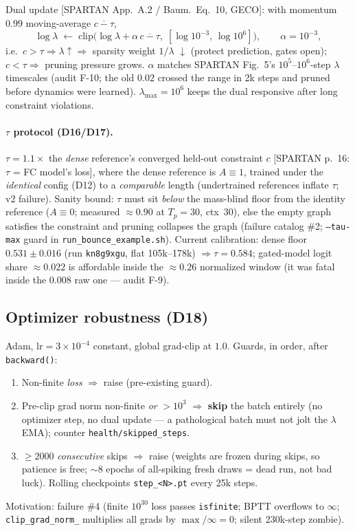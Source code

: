 \documentclass[11pt]{article}
\newcommand{\code}[1]{\texttt{\small #1}}
\newcommand{\paper}[1]{\textcolor{blue!60!black}{[#1]}}
\begin{document}
Dual update \paper{SPARTAN App.~A.2 / Baum.\ Eq.~10, GECO}: with momentum $0.99$
moving-average $\overline{c-\tau}$,
\[
  \log\lambda \;\leftarrow\; \mathrm{clip}\big(\log\lambda + \alpha\,\overline{c-\tau},\;
  [\log 10^{-3},\, \log 10^{6}]\big),\qquad \alpha = 10^{-3},
\]
i.e.\ $c > \tau \Rightarrow \lambda\uparrow \Rightarrow$ sparsity weight $1/\lambda$
$\downarrow$ (protect prediction, gates open); $c < \tau \Rightarrow$ pruning pressure
grows. $\alpha$ matches SPARTAN Fig.~5's $10^5$--$10^6$-step $\lambda$ timescales (audit
F-10; the old $0.02$ crossed the range in 2k steps and pruned before dynamics were
learned). $\lambda_{\max} = 10^6$ keeps the dual responsive after long constraint
violations.

\paragraph{$\tau$ protocol (D16/D17).} $\tau = 1.1\times$ the \emph{dense} reference's
converged held-out constraint $c$ \paper{SPARTAN p.~16: $\tau$ = FC model's loss}, where
the dense reference is $A\equiv1$, trained under the \emph{identical} config (D12) to a
\emph{comparable} length (undertrained references inflate $\tau$; v2 failure). Sanity
bound: $\tau$ must sit \emph{below} the mass-blind floor from the identity reference
($A\equiv0$; measured $\approx0.90$ at $T_p{=}30$, ctx~30), else the empty graph satisfies
the constraint and pruning collapses the graph (failure catalog \#2; \code{--tau-max}
guard in \code{run\_bounce\_example.sh}). Current calibration: dense floor
$0.531\pm0.016$ (run \code{kn8g9xgu}, flat 105k--178k) $\Rightarrow \tau = 0.584$;
gated-model logit share $\approx0.022$ is affordable inside the $\approx0.26$ normalized
window (it was fatal inside the $0.008$ raw one --- audit F-9).

\subsection{Optimizer robustness (D18)}
Adam, $\mathrm{lr}=3\times10^{-4}$ constant, global grad-clip at $1.0$. Guards, in order,
after \code{backward()}:
\begin{enumerate}[nosep]
  \item Non-finite \emph{loss} $\Rightarrow$ raise (pre-existing guard).
  \item Pre-clip grad norm non-finite \emph{or} $> 10^3$ $\Rightarrow$ \textbf{skip} the
        batch entirely (no optimizer step, no dual update --- a pathological batch must
        not jolt the $\lambda$ EMA); counter \code{health/skipped\_steps}.
  \item $\ge 2000$ \emph{consecutive} skips $\Rightarrow$ raise (weights are frozen during
        skips, so patience is free; $\sim$8 epochs of all-spiking fresh draws = dead run,
        not bad luck). Rolling checkpoints \code{step\_<N>.pt} every 25k steps.
\end{enumerate}
Motivation: failure \#4 (finite $10^{30}$ loss passes \code{isfinite}; BPTT overflows to
$\infty$; \code{clip\_grad\_norm\_} multiplies all grads by $\max/\infty = 0$; silent
230k-step zombie).
\end{document}
